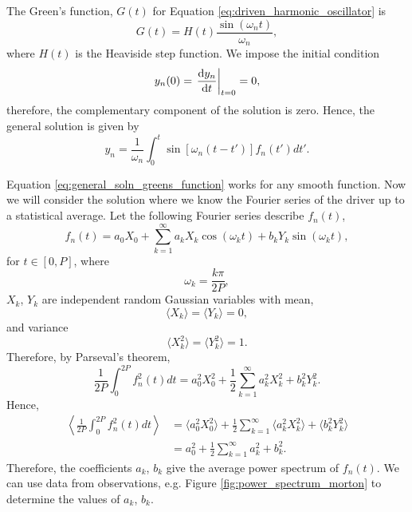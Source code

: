 The Green's function, $G(t)$ for Equation \eqref{eq:driven_harmonic_oscillator} is
\begin{equation}
    G(t) = H(t)\frac{\sin(\omega_n t)}{\omega_n},
\end{equation}
where $H(t)$ is the Heaviside step function.
We impose the initial condition
\begin{equation}
    \label{eq:initial_conditions_greens_function}
    y_n(0)=\left.\dv{y_n}{t}\right|_{t=0}=0,
\end{equation}
therefore, the complementary component of the solution is zero. Hence, the general solution is given by
\begin{equation}
    \label{eq:general_soln_greens_function}
    y_n=\frac{1}{\omega_n}\int_0^t\sin[\omega_n(t-t')]f_n(t')dt'.
\end{equation}

Equation \eqref{eq:general_soln_greens_function} works for any smooth function. Now we will consider the solution where we know the Fourier series of the driver up to a statistical average. Let the following Fourier series describe $f_n(t)$,
\begin{equation}
    \label{eq:random_fourier_series}
    f_n(t)=a_0X_0 + \sum_{k=1}^\infty a_k X_k\cos(\omega_kt) + b_k Y_k \sin(\omega_k t),
\end{equation}
for $t\in[0,P]$, where
\begin{equation}
    \label{eq:omega_k}
    \omega_k = \frac{k \pi}{2P},
\end{equation}
$X_k$, $Y_k$ are independent random Gaussian variables with mean, 
\[\langle X_k \rangle = \langle Y_k \rangle = 0,\]
and variance
\[\langle X_k^2 \rangle = \langle Y_k^2 \rangle = 1.\]
Therefore, by Parseval's theorem,
\begin{equation}
    \frac{1}{2P}\int_0^{2P}f_n^2(t)dt = a_0^2X_0^2+\frac{1}{2}\sum_{k=1}^\infty a_k^2X_k^2 + b_k^2Y_k^2.
\end{equation}
Hence,
\begin{equation}
\begin{aligned}
   \left\langle\frac{1}{2P}\int_0^{2P}f_n^2(t)dt\right\rangle &= \langle a_0^2X_0^2 \rangle +\frac{1}{2}\sum_{k=1}^\infty \langle a_k^2X_k^2 \rangle + \langle b_k^2Y_k^2 \rangle \\
    &= a_0^2+\frac{1}{2}\sum_{k=1}^\infty a_k^2 + b_k^2.
\end{aligned}
\end{equation}
Therefore, the coefficients $a_k$, $b_k$ give the average power spectrum of $f_n(t)$. We can use data from observations, e.g. Figure \ref{fig:power_spectrum_morton} to determine the values of $a_k$, $b_k$.

